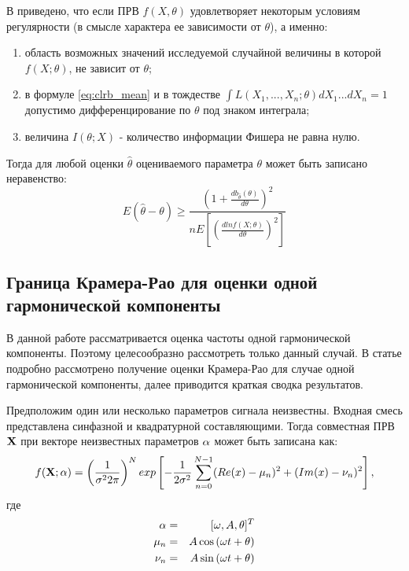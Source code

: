 В \cite{ayvazyan-book} приведено, что если  ПРВ ${f(X, \theta)}$  
удовлетворяет некоторым  условиям регулярности (в смысле характера ее зависимости от ${\theta}$), а именно:
\begin{enumerate}
\item область возможных значений исследуемой случайной величины в которой ${f(X; \theta)}$, не зависит от ${\theta}$;
\item в формуле \ref{eq:clrb_mean} и в тождестве ${\int L(X_1, ..., X_n;\theta) dX_1...dX_n = 1}$ допустимо дифференцирование по ${\theta}$ под знаком интеграла;
\item величина ${I(\theta; X)}$ - количество информации Фишера не равна нулю.
\end{enumerate}

Тогда для любой оценки ${\hat{\theta}}$ оцениваемого параметра ${\theta}$ может быть записано неравенство:
\begin{equation}
	\label{eq:crlb_base3}
	E(\hat{\theta} - \theta) \ge \frac{(1 + \frac{d b_{\hat{\theta}} (\theta)}{d \theta})^2}{n E \left[ \left( \frac{d ln f(X; \theta)}{d \theta} \right)^2 \right]}
\end{equation}

\subsection{Граница Крамера-Рао для оценки одной гармонической компоненты}
В данной работе рассматривается оценка частоты одной гармонической компоненты. Поэтому целесообразно рассмотреть только данный случай. В статье \cite{rife-crlb-article}
подробно рассмотрено получение оценки Крамера-Рао для случае одной гармонической компоненты, далее приводится краткая сводка результатов.

Предположим один или несколько параметров сигнала неизвестны. Входная смесь представлена синфазной и квадратурной составляющими. Тогда совместная ПРВ ${\bf{X}}$
при векторе неизвестных параметров ${\bf{\alpha}}$  может быть записана как:
\begin{equation}
	\label{eq:clrb_pdf}
	f({\bf{X}}; {\bf{\alpha}}) = \left( \frac{1}{\sigma^2 2 \pi} \right)^N exp \left[ -\frac{1}{2\sigma^2} \sum_{n=0}^{N-1} (Re(x)-\mu_n)^2 + (Im(x) - \nu_n)^2 \right],
\end{equation}
где
\begin{eqnarray}
	\label{eq:clrb_alpha}
	{\bf{\alpha}} & = & [\omega, A, \theta]^T \\
	\mu_n & = & A \cos{(\omega t + \theta)} \\
	\nu_n & = & A \sin{(\omega t + \theta)}
\end{eqnarray}

